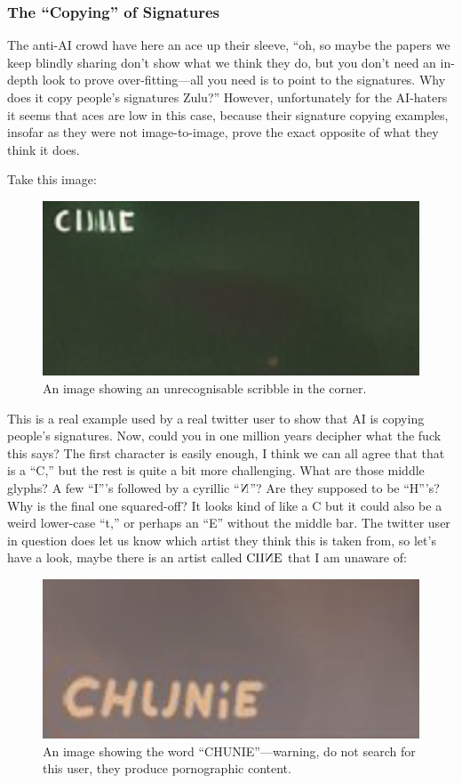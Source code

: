 \documentclass[11pt]{article}
\begin{document}
\subsubsection*{The ``Copying'' of Signatures}
\label{sec:orgdd6f8a8}
The anti-AI crowd have here an ace up their sleeve, ``oh, so maybe the papers we keep blindly sharing don't show what we think they do, but you don't need an in-depth look to prove over-fitting---all you need is to point to the signatures. Why does it copy people's signatures Zulu?'' However, unfortunately for the AI-haters it seems that aces are low in this case, because their signature copying examples, insofar as they were not image-to-image, prove the exact opposite of what they think it does.

Take this image:
\begin{figure}[htbp]
\centering
\includegraphics[width=.9\linewidth]{./images/ai-signature-copying-example-0-ai.jpg}
\caption{An image showing an unrecognisable scribble in the corner.}
\end{figure}

This is a real example used by a real twitter user to show that AI is copying people's signatures. Now, could you in one million years decipher what the fuck this says? The first character is easily enough, I think we can all agree that that is a ``C,'' but the rest is quite a bit more challenging. What are those middle glyphs? A few ``I'''s followed by a cyrillic ``\(\reflectbox{N}\)''? Are they supposed to be ``H'''s? Why is the final one squared-off? It looks kind of like a C but it could also be a weird lower-case ``t,'' or perhaps an ``E'' without the middle bar. The twitter user in question does let us know which artist they think this is taken from, so let's have a look, maybe there is an artist called \(\text{CII}\reflectbox{N}\text{E}\) that I am unaware of:
\begin{figure}[htbp]
\centering
\includegraphics[width=.9\linewidth]{./images/ai-signature-copying-example-0-orig.jpg}
\caption{An image showing the word ``CHUNIE''---warning, do not search for this user, they produce pornographic content.}
\end{figure}
\end{document}
